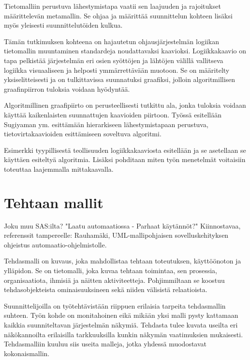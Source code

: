 \documentclass[finnish,12pt]{article}
\begin{document}
Tietomalliin perustuva lähestymistapa vaatii sen laajuuden ja rajoitukset määrittelevän metamallin.
Se ohjaa ja määrittää suunnittelun kohteen lisäksi myös yleisesti suunnittelutöiden kulkua.

Tämän tutkimuksen kohteena on hajautetun ohjausjärjestelmän logiikan tietomallin muuntaminen standardeja noudattavaksi kaavioksi.
Logiikkakaavio on tapa pelkistää järjestelmän eri osien syöttöjen ja lähtöjen välillä vallitseva logiikka visuaaliseen ja helposti ymmärrettävään muotoon.
Se on määritelty yksiselitteisesti ja on tulkittavissa suunnatuksi graafiksi, jolloin algoritmillisen graafinpiirron tuloksia voidaan hyödyntää.

Algoritmillinen graafipiirto on perusteellisesti tutkittu ala, jonka tuloksia voidaan käyttää kaikenlaisten suunnattujen kaavioiden piirtoon.
Työssä esitellään Sugiyaman ym. \cite{RefWorks:9} esittämään hierarkiseen lähestymistapaan perustuva, tietovirtakaavioiden esittämiseen soveltuva algoritmi.

Esimerkki tyypillisestä teollisuuden logiikkakaaviosta esitellään ja se asetellaan se käyttäen esiteltyä algoritmia.
Lisäksi pohditaan miten työn menetelmät voitaisiin toteuttaa laajemmalla mittakaavalla.

	\clearpage
	\section{Tehtaan mallit}

Joku muu SAS:ilta? "Laatu automaatiossa - Parhaat käytännöt?"
Kiinnostavaa, referenssit tampereelle: Rauhamäki, UML-mallipohjaisen sovelluskehityksen ohjeistus automaatio-ohjelmistolle.

Tehdasmalli on kuvaus, joka mahdollistaa tehtaan toteutuksen, käyttöönoton ja ylläpidon. Se on tietomalli, joka kuvaa tehtaan toimintaa, sen prosessia, organisaatiota, ihmisiä ja näitten aktiviteetteja.
Pohjimmiltaan se koostuu tehdasobjekteista ominaisuuksineen sekä niiden välisistä relaatioista. \cite{RefWorks:41}

Suunnittelijoilla on työtehtävistään riippuen erilaisia tarpeita tehdasmallin suhteen.
Työn kohde on monitahoinen eikä mikään yksi malli pysty kattamaan kaikkia suunniteltavan järjestelmän näkymiä.
Tehdasta tulee kuvata useilta eri näkökannoilta erilaisilla tarkkuuksilla kunkin näkymän vaatimuksien mukaisesti.
Tehdasmalliin kuuluu siis useita malleja, jotka yhdessä muodostavat kokonaismallin.
\end{document}

